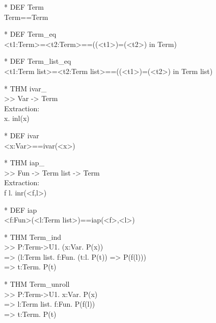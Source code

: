 \begin{prl*}
\>* DEF Term\\
\>  Term==Term
\end{prl*}

\begin{prl*}
\>* DEF Term\_eq\\
\>  <t1:Term>=<t2:Term>==((<t1>)=(<t2>) in Term)
\end{prl*}

\begin{prl*}
\>* DEF Term\_list\_eq\\
\>  <t1:Term list>=<t2:Term list>==((<t1>)=(<t2>) in Term list)
\end{prl*}

\begin{prl*}
\>* THM ivar\_\\
\>  >> Var -> Term\\
\>  Extraction:\\
\>  \mlambda{}x. inl(x)
\end{prl*}

\begin{prl*}
\>* DEF ivar\\
\>  <x:Var>==ivar(<x>)
\end{prl*}

\begin{prl*}
\>* THM iap\_\\
\>  >> Fun -> Term list -> Term\\
\>  Extraction:\\
\>  \mlambda{} f l. inr(<f,l>)
\end{prl*}

\begin{prl*}
\>* DEF iap\\
\>  <f:Fun>(<l:Term list>)==iap(<f>,<l>)
\end{prl*}

\begin{prl*}
\>* THM Term\_ind\\
\>  >> \mforall{}P:Term->U1. (\mforall{}x:Var. P(x))\\
\>               => (\mforall{}l:Term list. \mforall{}f:Fun. (\mforall{}t:l. P(t)) => P(f(l)))\\
\>               => \mforall{}t:Term. P(t)
\end{prl*}

\begin{prl*}
\>* THM Term\_unroll\\
\>  >> \mforall{}P:Term->U1. \mforall{}x:Var. P(x)\\
\>               => \mforall{}l:Term list. \mforall{}f:Fun. P(f(l))\\
\>               => \mforall{}t:Term. P(t)
\end{prl*}

